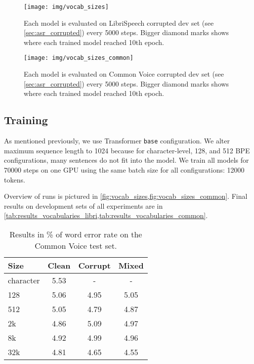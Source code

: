 \begin{figure}[p]
	\texttt{[image: img/vocab\_sizes]}
	\caption{Each model is evaluated on LibriSpeech corrupted dev set (see \cref{sec:asr_corrupted}) every 5000 steps. Bigger diamond marks shows where each trained model reached 10th epoch.}
	\label{fig:vocab_sizes}
\end{figure}

\begin{figure}[p]
	\texttt{[image: img/vocab\_sizes\_common]}
	\caption{Each model is evaluated on Common Voice corrupted dev set (see \cref{sec:asr_corrupted}) every 5000 steps. Bigger diamond marks shows where each trained model reached 10th epoch.}
	\label{fig:vocab_sizes_common}
\end{figure}


\subsection{Training}

As mentioned previously, we use Transformer \texttt{base} configuration. We alter maximum sequence length to 1024 because for character-level, 128, and 512 BPE configurations, many sentences do not fit into the model. We train all models for 70000 steps on one GPU using the same batch size for all configurations: 12000 tokens. 

Overview of runs is pictured in \cref{fig:vocab_sizes,fig:vocab_sizes_common}. Final results on development sets of all experiments are in \cref{tab:results_vocabularies_libri,tab:results_vocabularies_common}.


\begin{table}[p]
	\centering
	\begin{tabular}{l|ccc}
		\bf Size & \bf Clean & \bf Corrupt & \bf Mixed \\
		\hline
		character    &    5.53    &    -    &    - \\
		128    &    5.06    &    4.95    &    5.05 \\
		512    &    5.05    &    4.79    &    4.87 \\
		2k    &    4.86    &    5.09    &    4.97 \\
		8k    &    4.92    &    4.99    &    4.96 \\
		32k    &    4.81    &    4.65    &    4.55 \\
		
	\end{tabular}
	
	\caption{Results in \% of word error rate on the Common Voice test set.}
	\label{tab:results_vocabularies_common_test}
\end{table}

